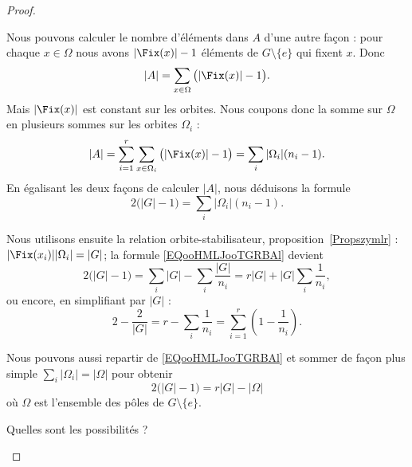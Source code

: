 \begin{proof}
\begin{subproof}
            Nous pouvons calculer le nombre d'éléments dans \( A \) d'une autre façon : pour chaque \( x\in \Omega\) nous avons \( | \Fix(x) |-1\) éléments de \( G\setminus\{ e \}\) qui fixent \( x\). Donc
            \begin{equation}
                | A |=\sum_{x\in\Omega}\big( | \Fix(x) |-1 \big).
            \end{equation}
            Mais \( | \Fix(x) |\) est constant sur les orbites. Nous coupons donc la somme sur \( \Omega\) en plusieurs sommes sur les orbites \( \Omega_i\) :
            \begin{equation}
                | A |=\sum_{i=1}^r\sum_{x\in \Omega_i}\big( | \Fix(x) |-1 \big)=\sum_i| \Omega_i |(n_i-1).
            \end{equation}
            En égalisant les deux façons de calculer \( | A |\), nous déduisons la formule
            \begin{equation}        \label{EQooHMLJooTGRBAl}
                2\big( | G |-1 \big)=\sum_i| \Omega_i |(n_i-1).
            \end{equation}

            Nous utilisons ensuite la relation orbite-stabilisateur, proposition~\ref{Propszymlr} : \( | \Fix(x_i) | |\Omega_i |=| G |\); la formule \eqref{EQooHMLJooTGRBAl} devient
            \begin{equation}
                2\big( | G |-1 \big)=\sum_i| G |-\sum_i\frac{ | G | }{ n_i }=r| G |+| G |\sum_i\frac{1}{ n_i },
            \end{equation}
            ou encore, en simplifiant par \( | G |\) :
            \begin{equation}        \label{EQooAMVBooDVcYeG}
                2-\frac{ 2 }{ | G | }=r-\sum_i\frac{1}{ n_i }=\sum_{i=1}^r\left( 1-\frac{1}{ n_i } \right).
            \end{equation}

            Nous pouvons aussi repartir de \eqref{EQooHMLJooTGRBAl} et sommer de façon plus simple \( \sum_i| \Omega_i |=| \Omega |\) pour obtenir
            \begin{equation}        \label{EQooTHUIooUEXsNl}
                2\big( | G |-1 \big)=r| G |-| \Omega |
            \end{equation}
            où \( \Omega\) est l'ensemble des pôles de \( G\setminus\{ e \}\).

        \item[Quelles sont les possibilités ?]


\end{subproof}
\end{proof}
